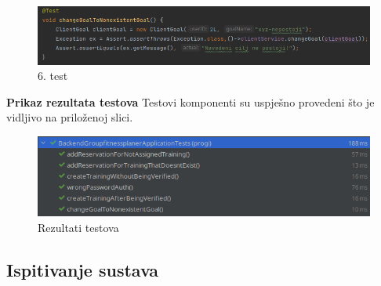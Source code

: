             \begin{figure}[H]
		\includegraphics[scale=0.65]{./Slike/test6.png}
		\centering
		\caption{6. test }
		\label{fig:promjene}
	    \end{figure}
     
            \noindent \textbf{Prikaz rezultata testova}
            \newline Testovi komponenti su uspješno provedeni što je vidljivo na priloženoj slici.
            \begin{figure}[H]
		\includegraphics[scale=0.65]{./Slike/test_results.png}
		\centering
		\caption{Rezultati testova }
		\label{fig:promjene}
	    \end{figure}
			
			
			
			\subsection{Ispitivanje sustava}
			
			 
			

